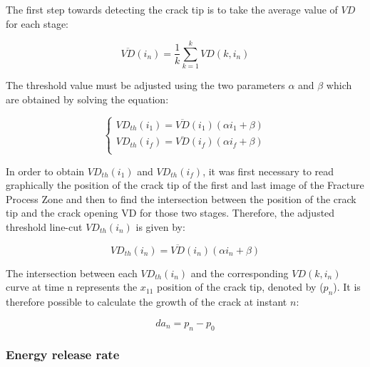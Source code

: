 \documentclass[3p,times,procedia]{elsarticle}
\begin{document}


\noindent The first step towards detecting the crack tip is to take the average value of $VD$ for each stage:

\begin{equation}
	\overline{VD}(i_n)=\frac{1}{k} \sum_{k=1}^{k}VD(k,i_n)
	\label{eq:eq24}
\end{equation}

\noindent The threshold value must be adjusted using the two parameters $\alpha$ and $\beta$ which are obtained by solving the equation:

\begin{equation}
	\begin{cases}
		VD_{th}(i_1)=\overline{VD}(i_1)(\alpha i_1 +\beta)\\
		VD_{th}(i_f)=\overline{VD}(i_f)(\alpha i_f +\beta)\\ 
	\end{cases}
	\label{eq:eq25}
\end{equation}

\noindent In order to obtain $VD_{th}(i_1)$ and $VD_{th}(i_f)$, it was first necessary to read graphically the position of the crack tip of the first and last image of the Fracture Process Zone and then to find the intersection between the position of the crack tip and the crack opening VD for those two stages. Therefore, the adjusted threshold line-cut $VD_{th}(i_n)$ is given by:

\begin{equation}
	VD_{th}(i_n)=\overline{VD}(i_n)(\alpha i_n +\beta)
	\label{eq:eq26}
\end{equation}

The intersection between each $VD_{th}(i_n)$ and the corresponding $VD(k, i_n)$ curve at time n represents the $x_{11}$ position of the crack tip, denoted by ($p_n$).
It is therefore possible to calculate the growth of the crack at instant $n$:

\begin{equation}
	da_n=p_n-p_0
	\label{eq:eq27}
\end{equation}

\subsubsection{Energy release rate}
\end{document}
